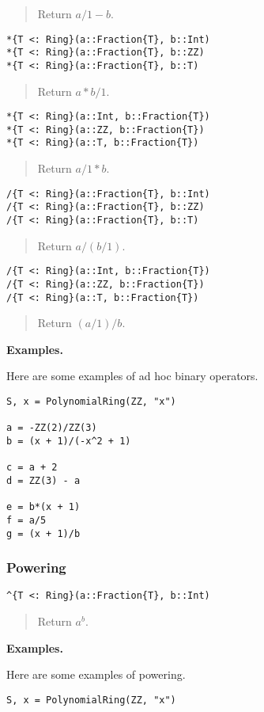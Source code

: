 \documentclass[a4paper,10pt]{article}
\newcommand{\desc}[1]{\vspace{-3mm}\begin{quote}#1\end{quote}}
\begin{document}
{{{\desc{Return $a/1 - b$.}

\begin{lstlisting}
*{T <: Ring}(a::Fraction{T}, b::Int)
*{T <: Ring}(a::Fraction{T}, b::ZZ)
*{T <: Ring}(a::Fraction{T}, b::T)
\end{lstlisting}

\desc{Return $a * b/1$.}

\begin{lstlisting}
*{T <: Ring}(a::Int, b::Fraction{T})
*{T <: Ring}(a::ZZ, b::Fraction{T})
*{T <: Ring}(a::T, b::Fraction{T})
\end{lstlisting}

\desc{Return $a/1 * b$.}

\begin{lstlisting}
/{T <: Ring}(a::Fraction{T}, b::Int)
/{T <: Ring}(a::Fraction{T}, b::ZZ)
/{T <: Ring}(a::Fraction{T}, b::T)
\end{lstlisting}

\desc{Return $a / (b/1)$.}

\begin{lstlisting}
/{T <: Ring}(a::Int, b::Fraction{T})
/{T <: Ring}(a::ZZ, b::Fraction{T})
/{T <: Ring}(a::T, b::Fraction{T})
\end{lstlisting}

\desc{Return $(a/1) / b$.}

\textbf{Examples.}

Here are some examples of ad hoc binary operators.

\begin{lstlisting}
S, x = PolynomialRing(ZZ, "x")

a = -ZZ(2)/ZZ(3)
b = (x + 1)/(-x^2 + 1)

c = a + 2
d = ZZ(3) - a

e = b*(x + 1)
f = a/5
g = (x + 1)/b
\end{lstlisting}

\subsubsection{Powering}

\begin{lstlisting}
^{T <: Ring}(a::Fraction{T}, b::Int)
\end{lstlisting}

\desc{Return $a^b$.}

\textbf{Examples.}

Here are some examples of powering.

\begin{lstlisting}
S, x = PolynomialRing(ZZ, "x")


\end{lstlisting}}}}
\end{document}
